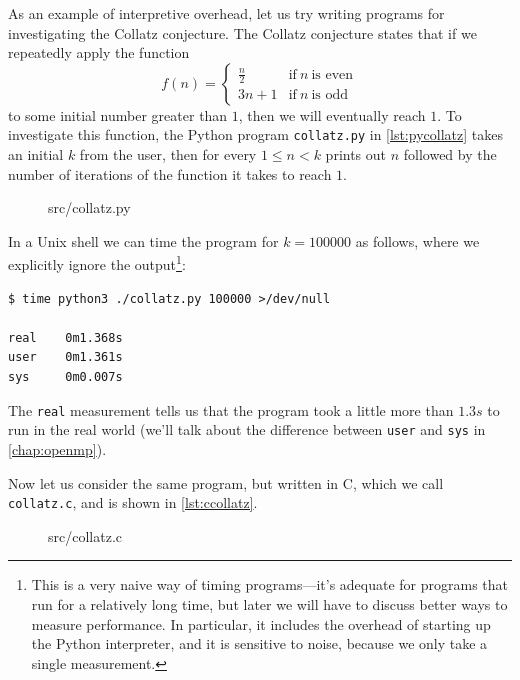 As an example of interpretive overhead, let us try writing programs
for investigating the Collatz conjecture.  The Collatz conjecture
states that if we repeatedly apply the function
\[
  f(n) =
  \begin{cases}
    \frac{n}{2} & \text{if}~n~\text{is even} \\
    3n+1 & \text{if}~n~\text{is odd}
  \end{cases}
\]
to some initial number greater than $1$, then we will eventually reach
$1$.  To investigate this function, the Python program
\texttt{collatz.py} in \cref{lst:pycollatz} takes an initial $k$ from
the user, then for every $1\leq n<k$ prints out $n$ followed by the
number of iterations of the function it takes to reach $1$.

\begin{figure}

{src/collatz.py}
\end{figure}

In a Unix shell we can time the program for $k=100000$ as follows,
where we explicitly ignore the output\footnote{This is a very naive
  way of timing programs---it's adequate for programs that run for a
  relatively long time, but later we will have to discuss better ways
  to measure performance.  In particular, it includes the overhead of
  starting up the Python interpreter, and it is sensitive to noise,
  because we only take a single measurement.}:

\begin{lstlisting}
$ time python3 ./collatz.py 100000 >/dev/null

real    0m1.368s
user    0m1.361s
sys     0m0.007s
\end{lstlisting}

The \texttt{real} measurement tells us that the program took a little
more than $1.3s$ to run in the real world (we'll talk about the
difference between \texttt{user} and \texttt{sys} in
\cref{chap:openmp}).

Now let us consider the same program, but written in C, which we call
\texttt{collatz.c}, and is shown in \cref{lst:ccollatz}.

\begin{figure}

{src/collatz.c}
\end{figure}

